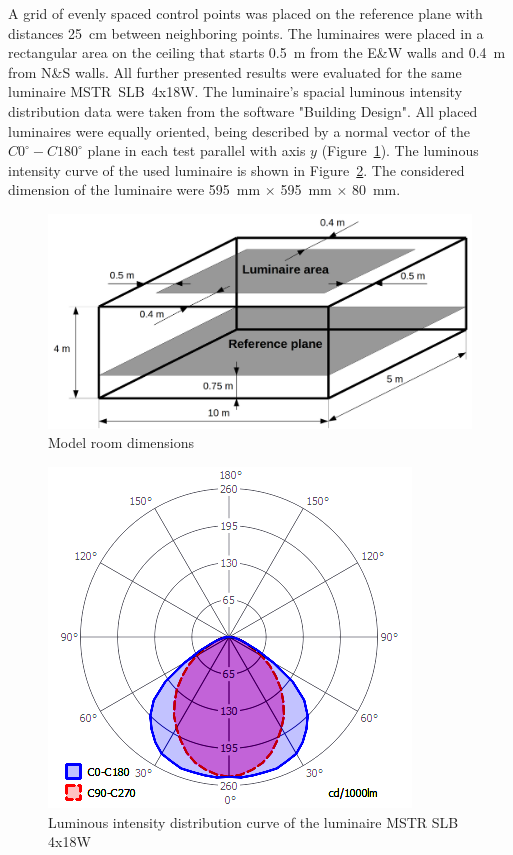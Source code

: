 A grid of evenly spaced control points was placed on the reference plane with distances 25~cm between neighboring points. The luminaires were placed in a rectangular area on the ceiling that starts 0.5~m from the E\&W walls and 0.4~m from N\&S walls. All further presented results were evaluated for the same luminaire  MSTR~SLB~4x18W. The luminaire's spacial luminous intensity distribution data were taken from the software "Building Design". All placed luminaires were equally oriented, being described by a normal vector of the $C0^\circ-C180^\circ$ plane in each test parallel with axis $y$ (Figure~\ref{fig:modRoom}). The luminous intensity curve of the used luminaire is shown in Figure~\ref{fig:IDiag}. The considered dimension of the luminaire were 595~mm $\times$ 595~mm $\times$ 80~mm.

\begin{figure}[htb]
  \centering
  \includegraphics[width=\columnwidth]{modRoom}
  \caption{Model room dimensions}
  \label{fig:modRoom}
\end{figure}

\begin{figure}[htb]
  \centering
  \includegraphics[width=0.8\columnwidth]{IDiag}
  \caption{Luminous intensity distribution curve of the luminaire MSTR SLB 4x18W}
  \label{fig:IDiag}
\end{figure}